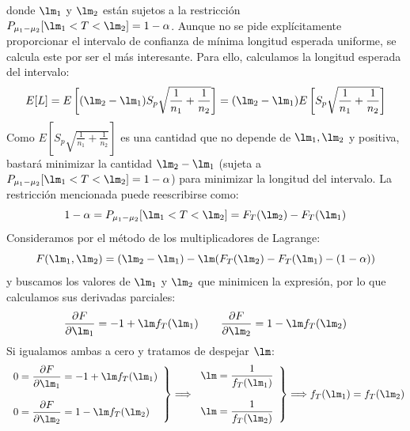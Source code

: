 \begin{ejercicio}
\begin{equation*}
    \end{equation*}
    donde $\lm_1$ y $\lm_2$ están sujetos a la restricción $P_{\mu_1-\mu_2}[\lm_1<T<\lm_2]=1-\alpha$. Aunque no se pide explícitamente proporcionar el intervalo de confianza de mínima longitud esperada uniforme, se calcula este por ser el más interesante. Para ello, calculamos la longitud esperada del intervalo:
    \begin{equation*}
        E[L] = E\left[(\lm_2-\lm_1)S_p\sqrt{\frac{1}{n_1}+\frac{1}{n_2}}\right] = (\lm_2-\lm_1)E\left[S_p\sqrt{\frac{1}{n_1}+\frac{1}{n_2}}\right]
    \end{equation*}
    Como $E\left[S_p\sqrt{\frac{1}{n_1}+\frac{1}{n_2}}\right]$ es una cantidad que no depende de $\lm_1,\lm_2$ y positiva, bastará minimizar la cantidad $\lm_2-\lm_1$ (sujeta a $P_{\mu_1-\mu_2}[\lm_1<T<\lm_2]=1-\alpha$) para minimizar la longitud del intervalo. La restricción mencionada puede reescribirse como:
    \begin{equation*}
        1-\alpha = P_{\mu_1-\mu_2}[\lm_1<T<\lm_2] = F_T(\lm_2) - F_T(\lm_1)
    \end{equation*}
    Consideramos por el método de los multiplicadores de Lagrange:
    \begin{equation*}
        F(\lm_1,\lm_2) = (\lm_2-\lm_1) - \lm(F_T(\lm_2) - F_T(\lm_1) - (1-\alpha))
    \end{equation*}
    y buscamos los valores de $\lm_1$ y $\lm_2$ que minimicen la expresión, por lo que calculamos sus derivadas parciales:
    \begin{equation*}
        \dfrac{\partial F}{\partial \lm_1} = -1+\lm f_T(\lm_1) \qquad \dfrac{\partial F}{\partial \lm_2} = 1-\lm f_T(\lm_2)
    \end{equation*}
    Si igualamos ambas a cero y tratamos de despejar $\lm$:
    \begin{equation*}
        \left.\begin{array}{l}
            0 = \dfrac{\partial F}{\partial \lm_1} = -1+\lm f_T(\lm_1) \\ \\
            0 = \dfrac{\partial F}{\partial \lm_2} = 1-\lm f_T(\lm_2)
        \end{array}\right\} \Longrightarrow \left.\begin{array}{l}
            \lm = \dfrac{1}{f_T(\lm_1)} \\ \\
            \lm = \dfrac{1}{f_T(\lm_2)}
        \end{array}\right\} \Longrightarrow f_T(\lm_1) = f_T(\lm_2)

\end{equation*}
\end{ejercicio}
